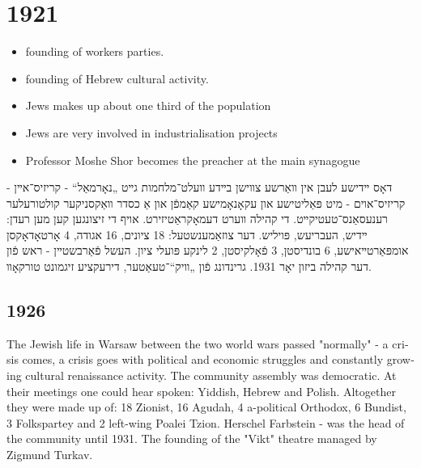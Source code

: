 \documentclass{article}
\begin{document}
\section { 1921 }
\begin{itemize}
\item founding of workers parties.
\item founding of Hebrew cultural activity.
\item Jews makes up about one third of the population 
\item Jews are very involved in industrialisation projects
\item Professor Moshe Shor becomes the preacher at the main synagogue
\end{itemize}
\begin{pairs}

\begin{Rightside}

\begin{RTL}
\begin{hebrew}
\beginnumbering

\autopar

דאָס ײדישע לעבן אין װאַרשע צװישן בײדע װעלט־מלחמות גײט „נאָרמאַל“
- קריזיס־אײן - קריזיס־אוים - מיט פּאַליטישע און עקאָנאָמישע קאַמפֿן
און אַ כסדר װאַקסניקער קולטורעלער רענעסאַנס־טעטיקײט.
די קהילה װערט דעמאָקראַטיזירט. אויף די זיצונגען קען מען רעדן: ײדיש, העבריעש, פּויליש.
דער צוזאַמענשטעל: 18 ציונים, 16 אגודה, 4 אָרטאָדאָקסן אומפּאַרטײאישע, 6 בונדיסטן, 3 פֿאָלקיסטן, 2 לינקע פּועלי ציון.
העשל פֿאַרבשטײן - ראש פֿון דער קהילה ביזון יאָר 1931. גרינדונג פֿון „װיק“־טעאַטער, דירעקציע זיגמונט טורקאָװ.

\endnumbering
\end{hebrew}
\end{RTL}
\end{Rightside}


\begin{Leftside}
\begin{english}
\section{ 1926  }
\beginnumbering
\autopar

The Jewish life in Warsaw between the two world wars passed "normally" - a crisis comes, a crisis goes with political and economic struggles and constantly growing cultural renaissance activity.  
The community assembly was democratic. At their meetings one could hear spoken: Yiddish,
Hebrew and Polish.
Altogether they were made up of: 18 Zionist, 16 Agudah, 4 a-political Orthodox, 6 Bundist, 3 Folkspartey 
and 2 left-wing Poalei Tzion.
Herschel Farbstein - was the head of the community until 1931. 
The founding of the "Vikt" theatre managed by Zigmund Turkav.

\endnumbering
\end{english}
\end{Leftside}
\end{pairs}
\Columns
\end{document}
